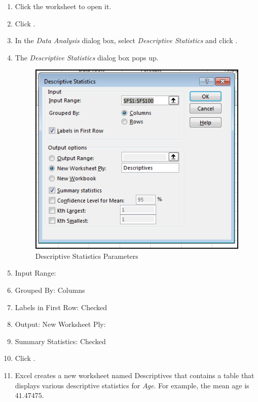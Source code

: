 \begin{enumbox}
	\begin{enumerate}
		\item Click the  worksheet to open it.
		\item Click .
		\item In the \textit{Data Analysis} dialog box, select \textit{Descriptive Statistics} and click .
		\item The \textit{Descriptive Statistics} dialog box pops up.

		\begin{figure}[H]
			\centering
			\includegraphics[width=\maxwidth{.75\linewidth}]{gfx/ch09_fig60}
			\caption{Descriptive Statistics Parameters}
			\label{09:fig60}
		\end{figure}

		\item Input Range: 
		\item Grouped By: Columns
		\item Labels in First Row: Checked
		\item Output: New Worksheet Ply: 
		\item Summary Statistics: Checked
		\item Click .
		\item Excel creates a new worksheet named Descriptives that contains a table that displays various descriptive statistics for \textit{Age}. For example, the mean age is $ 41.47475 $.
	\end{enumerate}
\end{enumbox}

